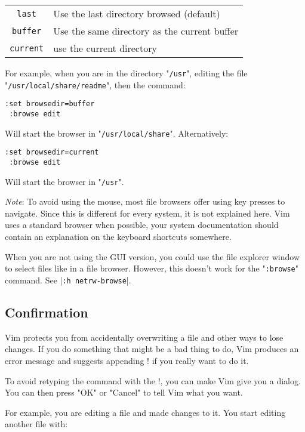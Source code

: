 \begin{center} \begin{tabular}{c l}
				\verb!last! & Use the last directory browsed (default) \\
				\verb!buffer! & Use the same directory as the current buffer \\
				\verb!current! & use the current directory \\
\end{tabular} \end{center}

For example, when you are in the directory "\verb!/usr!", editing the file "\verb!/usr/local/share/readme!", then the command:

\begin{Verbatim}[samepage=true]
 :set browsedir=buffer
 :browse edit
\end{Verbatim}

Will start the browser in "\verb!/usr/local/share!".
Alternatively:

\begin{Verbatim}[samepage=true]
 :set browsedir=current
 :browse edit
\end{Verbatim}

Will start the browser in "\verb!/usr!".

\emph{Note}: To avoid using the mouse, most file browsers offer using key presses to navigate.
Since this is different for every system, it is not explained here.
Vim uses a standard browser when possible, your system documentation should contain an explanation on the keyboard shortcuts somewhere.

When you are not using the GUI version, you could use the file explorer window to select files like in a file browser.
However, this doesn't work for the "\verb!:browse!" command.
See |\verb!:h netrw-browse!|.
\subsection{Confirmation}
Vim protects you from accidentally overwriting a file and other ways to lose changes.
If you do something that might be a bad thing to do, Vim produces an error message and suggests appending ! if you really want to do it.

To avoid retyping the command with the !, you can make Vim give you a dialog.
You can then press "OK" or "Cancel" to tell Vim what you want.

For example, you are editing a file and made changes to it.
You start editing another file with:

